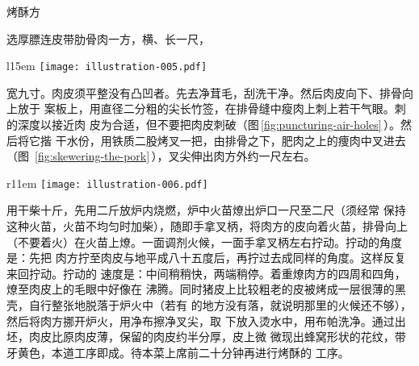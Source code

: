 \begin{recipe}{烤酥方}

\ingredients


\preparation

\step[选料及处理] 选厚膘连皮带肋骨肉一方，横、长一尺，
\begin{wrapfigure}[9]{l}{15em}%
\centering%
\vspace{-.875\baselineskip}%
\texttt{[image: illustration-005.pdf]}%
\vspace{-.125\baselineskip}%
\caption{刺气眼}
\label{fig:puncturing-air-holes}
\end{wrapfigure}
宽九寸。肉皮须平整没有凸凹者。先去净茸毛，刮洗干净。然后肉皮向下、排骨向上放于
案板上，用直径二分粗的尖长竹签，在排骨缝中瘦肉上刺上若干气眼。刺的深度以接近肉
皮为合适，但不要把肉皮刺破（图\,\ref{fig:puncturing-air-holes}\,）。然后将它揩
干水份，用铁质二股烤叉一把，由排骨之下，肥肉之上的痩肉中叉进去（图\,%
\ref{fig:skewering-the-pork}\,），叉尖伸出肉方外约一尺左右。

\begin{wrapfigure}[13]{r}{11em}%
\centering%
\vspace{-2\baselineskip}%
\texttt{[image: illustration-006.pdf]}%
\vspace{-.625\baselineskip}%
\caption{叉肉}
\label{fig:skewering-the-pork}
\end{wrapfigure}
%

\step[出坯] 用干柴十斤，先用二斤放炉内烧燃，炉中火苗燎出炉口一尺至二尺（须经常
保持这种火苗，火苗不均匀时加柴），随即手拿叉柄，将肉方的皮向着火苗，排骨向上
（不要着火）在火苗上燎。一面调剂火候，一面手拿叉柄左右拧动。拧动的角度是：先把
肉方拧至肉皮与地平成八十五度后，再拧过去成同样的角度。这样反复来回拧动。拧动的
速度是：中间稍稍快，两端稍停。着重燎肉方的四周和四角，燎至肉皮上的毛眼中好像在
沸腾。同时猪皮上比较粗老的皮被烤成一层很薄的黑壳，自行整张地脱落于炉火中（若有
的地方没有落，就说明那里的火候还不够），然后将肉方挪开炉火，用净布擦净叉尖，取
下放入烫水中，用布帕洗净。通过出坯，肉皮比原肉皮薄，保留的肉皮约半分厚，皮上微
微现出蜂窝形状的花纹，带牙黄色，本道工序即成。待本菜上席前二十分钟再进行烤酥的
工序。


\end{recipe}
